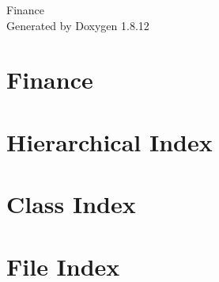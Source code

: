 \documentclass[twoside]{book}
\newcommand{\+}{\discretionary{\mbox{\scriptsize$\hookleftarrow$}}{}{}}
\newcommand{\clearemptydoublepage}{%
  \newpage{\pagestyle{empty}\cleardoublepage}%
}
\begin{document}
\hypersetup{pageanchor=false,
             bookmarksnumbered=true,
             pdfencoding=unicode
            }
\begin{titlepage}
\vspace*{7cm}
\begin{center}%
{\Large Finance }\\
\vspace*{1cm}
{\large Generated by Doxygen 1.8.12}\\
\end{center}
\end{titlepage}
\clearemptydoublepage
{}
\tableofcontents
\clearemptydoublepage
{}
\hypersetup{pageanchor=true}

\chapter{Finance}
\label{md__r_e_a_d_m_e}
\hypertarget{md__r_e_a_d_m_e}{}

\chapter{Hierarchical Index}

\chapter{Class Index}

\chapter{File Index}

\end{document}
